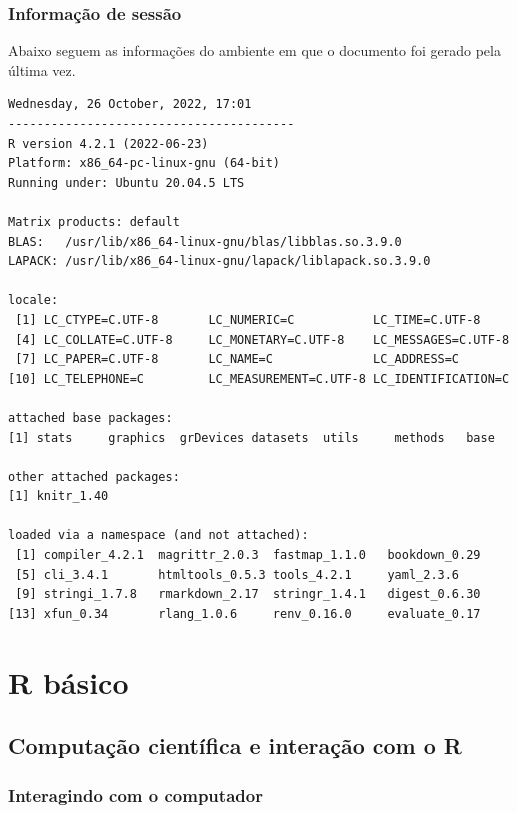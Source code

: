 \documentclass[
  10pt,
  a4paper]{book}
\begin{document}
\hypertarget{informauxe7uxe3o-de-sessuxe3o}{%
\section*{Informação de sessão}\label{informauxe7uxe3o-de-sessuxe3o}}


Abaixo seguem as informações do ambiente em que o documento foi gerado
pela última vez.

\begin{verbatim}
Wednesday, 26 October, 2022, 17:01
----------------------------------------
R version 4.2.1 (2022-06-23)
Platform: x86_64-pc-linux-gnu (64-bit)
Running under: Ubuntu 20.04.5 LTS

Matrix products: default
BLAS:   /usr/lib/x86_64-linux-gnu/blas/libblas.so.3.9.0
LAPACK: /usr/lib/x86_64-linux-gnu/lapack/liblapack.so.3.9.0

locale:
 [1] LC_CTYPE=C.UTF-8       LC_NUMERIC=C           LC_TIME=C.UTF-8       
 [4] LC_COLLATE=C.UTF-8     LC_MONETARY=C.UTF-8    LC_MESSAGES=C.UTF-8   
 [7] LC_PAPER=C.UTF-8       LC_NAME=C              LC_ADDRESS=C          
[10] LC_TELEPHONE=C         LC_MEASUREMENT=C.UTF-8 LC_IDENTIFICATION=C   

attached base packages:
[1] stats     graphics  grDevices datasets  utils     methods   base     

other attached packages:
[1] knitr_1.40

loaded via a namespace (and not attached):
 [1] compiler_4.2.1  magrittr_2.0.3  fastmap_1.1.0   bookdown_0.29  
 [5] cli_3.4.1       htmltools_0.5.3 tools_4.2.1     yaml_2.3.6     
 [9] stringi_1.7.8   rmarkdown_2.17  stringr_1.4.1   digest_0.6.30  
[13] xfun_0.34       rlang_1.0.6     renv_0.16.0     evaluate_0.17  
\end{verbatim}

\hypertarget{part-r-buxe1sico}{%
\part{R básico}\label{part-r-buxe1sico}}

\hypertarget{computauxe7uxe3o-cientuxedfica-e-interauxe7uxe3o-com-o-r}{%
\chapter{Computação científica e interação com o R}\label{computauxe7uxe3o-cientuxedfica-e-interauxe7uxe3o-com-o-r}}

\hypertarget{interagindo-com-o-computador}{%
\section{Interagindo com o computador}\label{interagindo-com-o-computador}}
\end{document}
